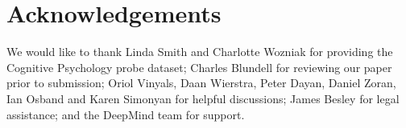 \documentclass{article}
\begin{document}
\section*{Acknowledgements} 

We would like to thank Linda Smith and Charlotte Wozniak for providing the Cognitive Psychology probe dataset; Charles Blundell for reviewing our paper prior to submission; Oriol Vinyals, Daan Wierstra, Peter Dayan, Daniel Zoran, Ian Osband and Karen Simonyan for helpful discussions; James Besley for legal assistance; and the DeepMind team for support. 


\newpage


\end{document}
